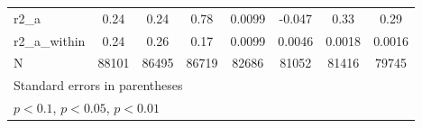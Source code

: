 {\begin{tabular}{l*{7}{c}}
\midrule
r2\_a                &        0.24         &        0.24         &        0.78         &      0.0099         &      -0.047         &        0.33         &        0.29         \\
r2\_a\_within         &        0.24         &        0.26         &        0.17         &      0.0099         &      0.0046         &      0.0018         &      0.0016         \\
N                   &       88101         &       86495         &       86719         &       82686         &       81052         &       81416         &       79745         \\
\bottomrule
\multicolumn{8}{l}{\footnotesize Standard errors in parentheses}\\
\multicolumn{8}{l}{\footnotesize \sym{*} \(p<0.1\), \sym{**} \(p<0.05\), \sym{***} \(p<0.01\)}\\
\end{tabular}
}
